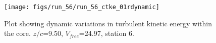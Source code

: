 \begin{figure}[H]
\centering
\texttt{[image: figs/run\_56/run\_56\_ctke\_01rdynamic]}
\caption{Plot showing dynamic variations in turbulent kinetic energy within the core. $z/c$=9.50, $V_{free}$=24.97, station 6.}
\label{fig:run_56_ctke_01rdynamic}
\end{figure}


